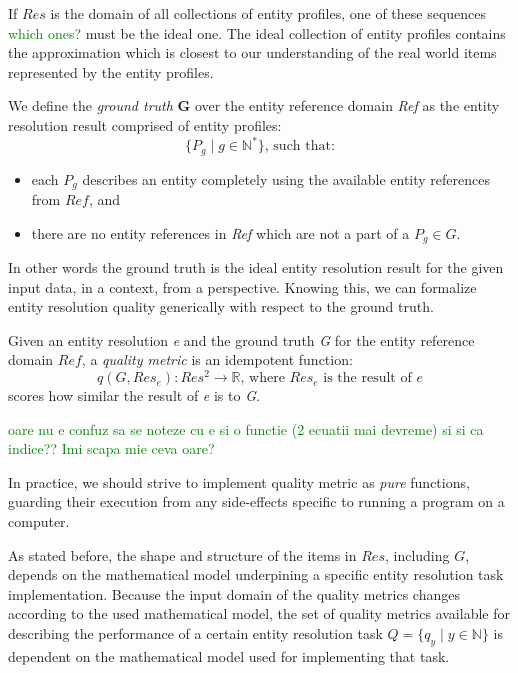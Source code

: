 \documentclass[journal]{IEEEtran}
\begin{document}
    If $Res$ is the domain of all collections of entity profiles, one of
    these sequences 
    \textcolor{green}{which ones?} 
    must be the ideal one.
    The ideal collection of entity profiles contains the approximation which is
    closest to our understanding of the real world items represented by the
    entity profiles.

    \begin{defn}
        We define the \textit{ground truth} \textbf{G} over the entity reference
        domain \textit{Ref} as the entity resolution result comprised of entity
        profiles:
        \[
            \{P_g \mid g \in \mathbb{N^*}\}\textrm{, such that:}
        \]
        \begin{itemize}
            \item each $P_g$ describes an entity completely using the available
            entity references from $Ref$, and
            \item there are no entity references in \textit{Ref} which are not a
            part of a $P_g \in G$.
        \end{itemize}
    \end{defn}

    In other words the ground truth is the ideal entity resolution result for 
    the given input data, in a context, from a perspective.
    Knowing this, we can formalize entity resolution quality generically with
    respect to the ground truth.
    
    \begin{defn}
    Given an entity resolution \textit{e} and the ground truth \textit{G} for
    the entity reference domain $Ref$, a \textit{quality metric} is an
    idempotent function:
    \[
        q(G, Res_e): Res^2 \rightarrow \mathbb{R}\textrm{, where
        }Res_e\textrm{ is the result of }e
    \]
    scores how similar the result of \textit{e} is to \textit{G}.
    \end{defn}
    \textcolor{green}{oare nu e confuz sa se noteze cu e si o functie (2 ecuatii mai devreme) si si ca indice?? Imi scapa mie ceva oare?}

    In practice, we should strive to implement quality metric as \textit{pure}
    functions, guarding their execution from any side-effects specific to
    running a program on a computer.

    As stated before, the shape and structure of the items in $Res$, including
    $G$, depends on the mathematical model underpining a specific entity
    resolution task implementation.
    Because the input domain of the quality metrics changes according to the
    used mathematical model, the set of quality metrics available for describing
    the performance of a certain entity resolution task $Q = \{q_y \mid y \in
    \mathbb{N}\}$ is dependent on the mathematical model used for implementing
    that task.
\end{document}
